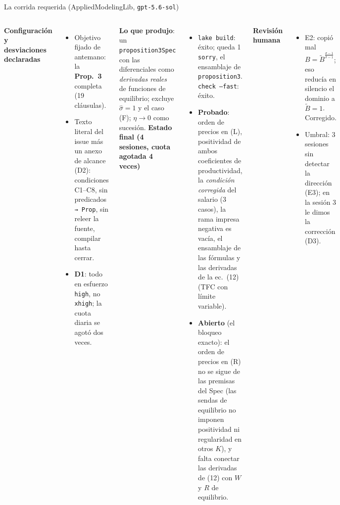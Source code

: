 \documentclass[aspectratio=169,10pt]{beamer}
\newcommand{\sh}{\hat\sigma}
\begin{document}
\begin{frame}{La corrida requerida (AppliedModelingLib, \texttt{gpt-5.6-sol})}
\scriptsize
\begin{columns}[T]
\textbf{Configuración y desviaciones declaradas}
\begin{itemize}\setlength\itemsep{1pt}
  \item Objetivo fijado de antemano: la \textbf{Prop.~3} completa (19 cláusulas).
  \item Texto literal del issue más un anexo de alcance (D2): condiciones C1–C8, sin predicados \texttt{→ Prop}, sin releer la fuente, compilar hasta cerrar.
  \item \textbf{D1}: todo en esfuerzo \texttt{high}, no \texttt{xhigh}; la cuota diaria se agotó dos veces.
\end{itemize}
\textbf{Lo que produjo}: un \texttt{proposition3Spec} con las diferenciales como \emph{derivadas reales} de funciones de equilibrio; excluye $\sh=1$ y el caso (F); $\eta\to0$ como sucesión.
\textbf{Estado final (4 sesiones, cuota agotada 4 veces)}
\begin{itemize}\setlength\itemsep{1pt}
  \item \texttt{lake build}: \textcolor{posc}{éxito}; queda 1 \texttt{sorry}, el ensamblaje de \texttt{proposition3}. \texttt{check --fast}: \textcolor{posc}{éxito}.
  \item \textbf{Probado}: orden de precios en (L), positividad de ambos coeficientes de productividad, la \emph{condición corregida} del salario (3 casos), la rama impresa negativa es vacía, el ensamblaje de las fórmulas y las derivadas de la ec.~(12) (TFC con límite variable).
  \item \textbf{Abierto} (el bloqueo exacto): el orden de precios en (R) no se sigue de las premisas del Spec (las sendas de equilibrio no imponen positividad ni regularidad en otros $K$), y falta conectar las derivadas de (12) con $W$ y $R$ de equilibrio.
\end{itemize}
\textbf{Revisión humana}
\begin{itemize}\setlength\itemsep{1pt}
  \item \textcolor{negc}{E2}: copió mal $B=\tilde B^{\frac{\sigma-1}{\sh-1}}$; eso reducía en silencio el dominio a $\tilde B=1$. Corregido.
  \item Umbral: 3 sesiones sin detectar la dirección (E3); en la sesión 3 le dimos la corrección (D3).
\end{itemize}
\end{columns}
\end{frame}
\end{document}
